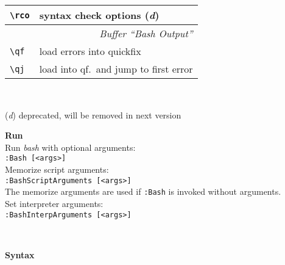 \documentclass[oneside,11pt,landscape,DIV16]{scrartcl}
\begin{document}
\begin{multicols}{3}
\begin{center}
\begin{tabular}[]{|p{11mm}|p{60mm}|}
\hline \verb'\rco' & syntax check options                 \hfill {(\textit{d})}\\
\hline
\hline
\multicolumn{2}{|r|}{\textsl{Buffer ``Bash Output''}} \\[1.0ex]
\hline \verb'\qf'  & load errors into quickfix             \\
\hline \verb'\qj'  & load into qf.~and jump to first error \\
\hline
\end{tabular}\\[1.0ex]
%
\begin{minipage}[b]{72mm}%
\scriptsize{%
{\normalsize (\textit{d})} deprecated, will be removed in next version
}%
\end{minipage}
\columnbreak
%
%
\begin{minipage}[b]{72mm}%
\large{\textbf{Run}}\\[1.0ex]
Run \textit{bash} with optional arguments: \\[0.5ex]
\texttt{:Bash [<args>]} \\[1.0ex]
Memorize script arguments: \\[0.5ex]
\texttt{:BashScriptArguments [<args>]} \\[0.5ex]
The memorize arguments are used if \texttt{:Bash} is invoked without arguments. \\[1.0ex]
Set interpreter arguments: \\[0.5ex]
\texttt{:BashInterpArguments [<args>]}
\end{minipage}
\\[2.5ex]
%
\begin{minipage}[b]{72mm}%
\large{\textbf{Syntax}}\\[1.0ex]

\end{minipage}
\end{center}
\end{multicols}
\end{document}
